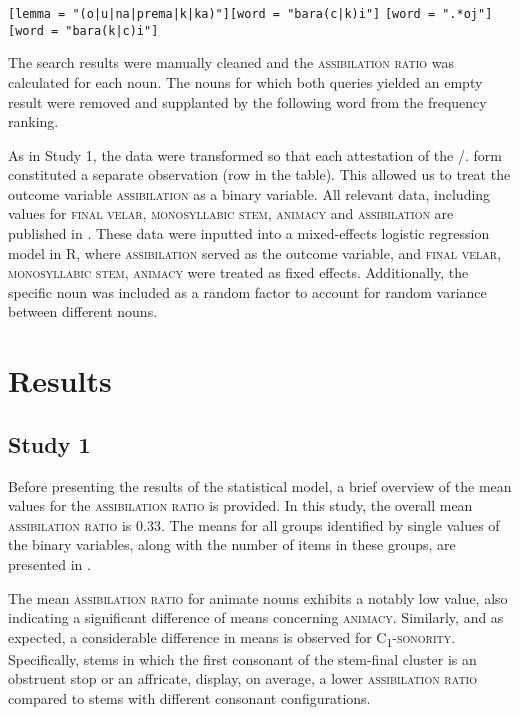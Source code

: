 \documentclass[output=paper,colorlinks,citecolor=brown]{langscibook}
\begin{document}
\ea \ea  \texttt{[lemma = "(o|u|na|prema|k|ka)"][word = "bara(c|k)i"]} \label{sim:ex:cql2:datloc}
\ex \texttt{[word = ".*oj"][word = "bara(k|c)i"]} \label{sim:ex:cql3:datloc}
\z\z

\noindent The search results were manually cleaned and the \textsc{assibilation ratio} was calculated for each noun. The nouns for which both queries yielded an empty result were removed and supplanted by the following word from the frequency ranking.

As in Study 1, the data were transformed so that each attestation of the {\DAT}{\slash}{\LOC.\SG} form constituted a separate observation (row in the table). This allowed us to treat the outcome variable \textsc{assibilation} as a binary variable. All relevant data, including values for \textsc{final velar}, \textsc{monosyllabic stem}, \textsc{animacy} and \textsc{assibilation} are published in \citet{Simonovic2024}. These data were inputted into a mixed-effects logistic regression model in R, where \textsc{assibilation} served as the outcome variable, and \textsc{final velar}, \textsc{monosyllabic stem}, \textsc{animacy} were treated as fixed effects. Additionally, the specific noun was included as a random factor to account for random variance between different nouns.

\section{Results}
\label{sim:sec:results}

\subsection{Study 1}
\label{sim:sec:results1}

Before presenting the results of the statistical model, a brief overview of the mean values for the \textsc{assibilation ratio} is provided. In this study, the overall mean \textsc{assibilation ratio} is 0.33. The means for all groups identified by single values of the binary variables, along with the number of items in these groups, are presented in .

The mean \textsc{assibilation ratio} for animate nouns exhibits a notably low value, also indicating a significant difference of means concerning \textsc{animacy}. Similarly, and as expected, a considerable difference in means is observed for \textsc{C\textsubscript{1}-sonority}. Specifically, stems in which the first consonant of the stem-final cluster is an obstruent stop or an affricate, display, on average, a lower \textsc{assibilation ratio} compared to stems with different consonant configurations.
\end{document}
